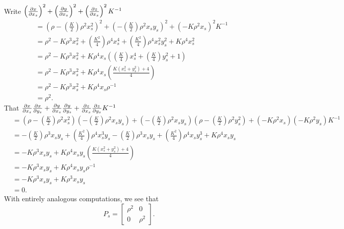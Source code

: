 \documentclass[newpage,hints,handout,12pt,noauthor,nooutcomes]{ximera}
\begin{document}
\begin{problem}
\begin{freeResponse}
  Write $\left(\pp[x]{x_s}\right)^2 + \left(\pp[y]{x_s}\right)^2 +\left(\pp[z]{x_s}\right)^2K^{-1}$
  \begin{align*}
    &=\left(\rho-\left(\frac{K}{2}\right)\rho^2x_s^2\right)^2 + \left(-\left(\frac{K}{2}\right)\rho^2x_sy_s\right)^2 +\left(-K\rho^2x_s\right)^2K^{-1}\\
    &=\rho^2 -K\rho^3x_s^2 + \left(\frac{K^2}{4}\right)\rho^4x_s^4 + \left(\frac{K^2}{4}\right)\rho^4x_s^2y_s^2 + K\rho^4x_s^2\\
    &=\rho^2 -K\rho^3x_s^2 + K\rho^4x_s\left(\left(\frac{K}{4}\right)x_s^4 + \left(\frac{K}{4}\right)y_s^2 + 1\right)\\
    &=\rho^2 -K\rho^3x_s^2 + K\rho^4x_s\left(\frac{K\left(x_s^2+y_s^2\right)+4}{4}\right)\\
    &=\rho^2 -K\rho^3x_s^2 + K\rho^4x_s\rho^{-1}\\
    &=\rho^2.
  \end{align*}
  That $\pp[x]{x_s}\pp[x]{y_s} + \pp[y]{x_s}\pp[y]{y_s} + \pp[z]{x_s}\pp[z]{y_s} K^{-1}$
  \begin{align*}
    &=\left(\rho-\left(\frac{K}{2}\right)\rho^2x_s^2\right)\left(-\left(\frac{K}{2}\right)\rho^2x_sy_s\right)
    + \left(-\left(\frac{K}{2}\right)\rho^2x_sy_s\right)\left(\rho-\left(\frac{K}{2}\right)\rho^2y_s^2\right)
    + \left(-K\rho^2x_s\right)\left(-K\rho^2y_s\right) K^{-1}\\
    &=
    -\left(\frac{K}{2}\right)\rho^3x_sy_s+\left(\frac{K^2}{4}\right)\rho^4x_s^3y_s
    -\left(\frac{K}{2}\right)\rho^3x_sy_s+\left(\frac{K^2}{4}\right)\rho^4x_sy_s^3
    + K\rho^4 x_sy_s\\
    &= -K\rho^3x_sy_s + K\rho^4x_sy_s\left(\frac{K\left(x_s^2+y_s^2\right)+4}{4}\right)\\
    &= -K\rho^3x_sy_s + K\rho^4x_sy_s\rho^{-1}\\
    &= -K\rho^3x_sy_s + K\rho^3x_sy_s\\
    &=0.
  \end{align*}
  With entirely analogous computations, we see that 
    \[
    P_s =
    \begin{bmatrix}
      \rho^2 & 0\\
      0 & \rho^2
    \end{bmatrix}.
    \]


\end{freeResponse}

\end{problem}
\end{document}
